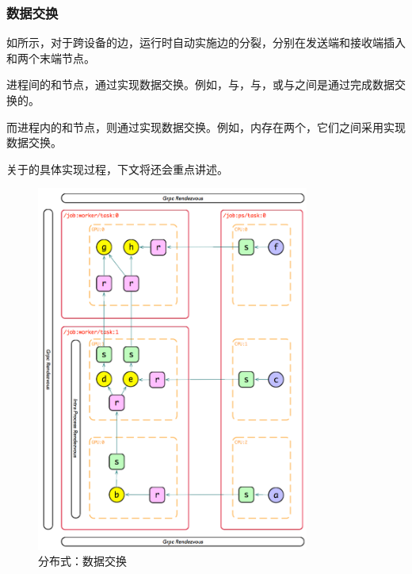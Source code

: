\begin{content}
\subsubsection{数据交换}

如所示，对于跨设备的边，运行时自动实施边的分裂，分别在发送端和接收端插入和两个末端节点。

进程间的和节点，通过实现数据交换。例如，与，与，或与之间是通过完成数据交换的。

而进程内的和节点，则通过实现数据交换。例如，内存在两个，它们之间采用实现数据交换。

关于的具体实现过程，下文将还会重点讲述。

\begin{figure}[H]
\centering
\includegraphics[width=0.8\textwidth]{figures/dist-exp-2.png}
\caption{分布式：数据交换}
 \label{fig:dist-exp-2}
\end{figure}


\end{content}
